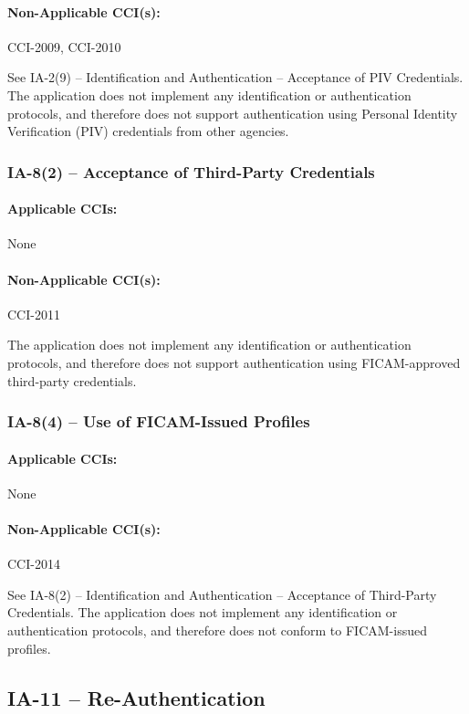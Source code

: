 \documentclass[letterpaper, 10pt, twoside]{article}
\begin{document}
\paragraph{Non-Applicable CCI(s):} CCI-2009, CCI-2010

See IA-2(9) – Identification and Authentication – Acceptance of PIV Credentials. The application does not implement any identification or authentication protocols, and therefore does not support authentication using Personal Identity Verification (PIV) credentials from other agencies.

\subsubsection{IA-8(2) -- Acceptance of Third-Party Credentials}

\paragraph{Applicable CCIs:} None

\paragraph{Non-Applicable CCI(s):} CCI-2011

The application does not implement any identification or authentication protocols, and therefore does not support authentication using FICAM-approved third-party credentials.

\subsubsection{IA-8(4) -- Use of FICAM-Issued Profiles}

\paragraph{Applicable CCIs:} None

\paragraph{Non-Applicable CCI(s):} CCI-2014

See IA-8(2) – Identification and Authentication – Acceptance of Third-Party Credentials. The application does not implement any identification or authentication protocols, and therefore does not conform to FICAM-issued profiles.

\subsection{IA-11 -- Re-Authentication}
\end{document}
